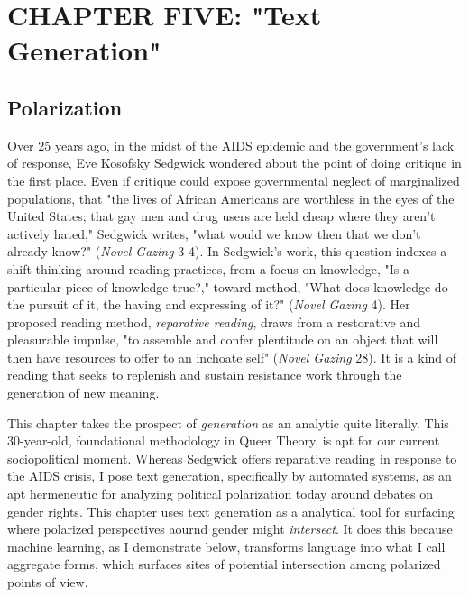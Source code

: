 \documentclass[11pt]{article}
\author{fcalado}
\date{\today}
\title{}
\begin{document}
\tableofcontents

\section{CHAPTER FIVE:  "Text Generation"}
\label{sec:org8367e96}
\subsection{Polarization}
\label{sec:org0c5f6df}
Over 25 years ago, in the midst of the AIDS epidemic and the
government's lack of response, Eve Kosofsky Sedgwick wondered about
the point of doing critique in the first place. Even if critique could
expose governmental neglect of marginalized populations, that "the
lives of African Americans are worthless in the eyes of the United
States; that gay men and drug users are held cheap where they aren't
actively hated," Sedgwick writes, "what would we know then that we
don't already know?" (\emph{Novel Gazing} 3-4). In Sedgwick's work, this
question indexes a shift thinking around reading practices, from a
focus on knowledge, "Is a particular piece of knowledge true?," toward
method, "What does knowledge do--the pursuit of it, the having and
expressing of it?" (\emph{Novel Gazing} 4). Her proposed reading method,
\emph{reparative reading}, draws from a restorative and pleasurable
impulse, "to assemble and confer plentitude on an object that will
then have resources to offer to an inchoate self" (\emph{Novel Gazing} 28).
It is a kind of reading that seeks to replenish and sustain resistance
work through the generation of new meaning.

This chapter takes the prospect of \emph{generation} as an analytic quite
literally. This 30-year-old, foundational methodology in Queer Theory,
is apt for our current sociopolitical moment. Whereas Sedgwick offers
reparative reading in response to the AIDS crisis, I pose text
generation, specifically by automated systems, as an apt hermeneutic
for analyzing political polarization today around debates on gender
rights. This chapter uses text generation as a analytical tool for
surfacing where polarized perspectives aournd gender might
\emph{intersect}. It does this because machine learning, as I demonstrate
below, transforms language into what I call aggregate forms, which
surfaces sites of potential intersection among polarized points of
view.
\end{document}
